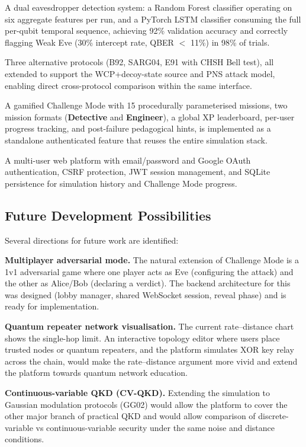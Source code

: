 \documentclass[12pt, a4paper]{article}
\begin{document}
A dual eavesdropper detection system: a Random Forest classifier operating
on six aggregate features per run, and a PyTorch LSTM classifier consuming
the full per-qubit temporal sequence, achieving 92\% validation accuracy
and correctly flagging Weak Eve (30\% intercept rate, QBER $<$ 11\%) in
98\% of trials.

Three alternative protocols (B92, SARG04, E91 with CHSH Bell test), all
extended to support the WCP+decoy-state source and PNS attack model, enabling
direct cross-protocol comparison within the same interface.

A gamified Challenge Mode with 15 procedurally parameterised missions,
two mission formats (\textbf{Detective} and \textbf{Engineer}), a global XP leaderboard,
per-user progress tracking, and post-failure pedagogical hints, is implemented
as a standalone authenticated feature that reuses the entire simulation stack.

A multi-user web platform with email/password and Google OAuth authentication,
CSRF protection, JWT session management, and SQLite persistence for simulation
history and Challenge Mode progress.

\newpage
\subsection{Future Development Possibilities}
\label{sec:future-work}

Several directions for future work are identified:

\textbf{Multiplayer adversarial mode.} The natural extension of Challenge
Mode is a 1v1 adversarial game where one player acts as Eve
(configuring the attack) and the other as Alice/Bob (declaring a verdict).
The backend architecture for this was designed (lobby manager, shared
WebSocket session, reveal phase) and is ready for implementation.

\textbf{Quantum repeater network visualisation.} The current rate--distance
chart shows the single-hop limit. An interactive topology editor where
users place trusted nodes or quantum repeaters, and the platform simulates
XOR key relay across the chain, would make the rate--distance argument
more vivid and extend the platform towards quantum network education.

\textbf{Continuous-variable QKD (CV-QKD).} Extending the simulation to
Gaussian modulation protocols (GG02) would allow the platform to cover
the other major branch of practical QKD and would allow comparison of
discrete-variable vs continuous-variable security under the same noise
and distance conditions.
\end{document}
